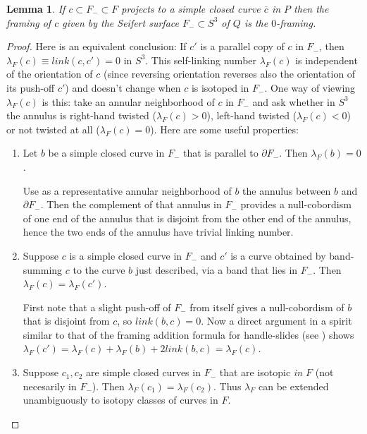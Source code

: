 \documentclass{amsart}
\newtheorem{lemma}[thm]{Lemma}
\newcommand{\bdd}{\mbox{$\partial$}}
\begin{document}
\begin{lemma} \label{lemma:framing} If $c \subset F_- \subset F$ projects to a simple closed curve $\overline{c}$ in $P$ then the framing of $c$ given by the Seifert surface $F_- \subset S^3$ of $Q$ is the $0$-framing. \end{lemma}

\begin{proof}  Here is an equivalent conclusion:  If $c'$ is a parallel copy of $c$ in $F_-$, then $\lambda_F(c) \equiv link(c, c') = 0$ in $S^3$.  This self-linking number $\lambda_F(c)$ is independent of the orientation of $c$ (since reversing orientation reverses also the orientation of its push-off $c'$) and doesn't change when $c$ is isotoped in $F_-$.  One way of viewing $\lambda_F(c)$ is this: take an annular neighborhood of $c$ in $F_-$ and ask whether in $S^3$ the annulus is right-hand twisted ($\lambda_F(c) > 0$), left-hand twisted ($\lambda_F(c) < 0$) or not twisted at all ($\lambda_F(c) = 0$).  Here are some useful properties:

\begin{enumerate}[ (a) ]
\item Let $b$ be a simple closed curve in $F_-$ that is parallel to $\bdd F_-$.  Then $\lambda_F(b) = 0$.

Use as a representative annular neighborhood of $b$ the annulus between $b$ and $\bdd F_-$.  Then the complement of that annulus in $F_-$ provides a null-cobordism of one end of the annulus that is disjoint from the other end of the annulus, hence the two ends of the annulus have trivial linking number.

\item  Suppose $c$ is a simple closed curve in $F_-$ and $c'$ is a curve obtained by band-summing $c$ to the curve $b$ just described, via a band that lies in $F_-$.  Then  $\lambda_F(c) = \lambda_F(c').$

First note that a slight push-off of $F_-$ from itself gives a null-cobordism of $b$ that is disjoint from $c$, so $link(b, c) = 0$.  Now a direct argument in a spirit similar to that of the framing addition formula for handle-slides (see \cite[5.1.1]{GS}) shows $\lambda_F(c') = \lambda_F(c) + \lambda_F(b) + 2link(b, c) = \lambda_F(c).$

\item \label{enum:isotopy} Suppose $c_1, c_2$ are simple closed curves in $F_-$ that are isotopic {\em in $F$} (not necesarily in $F_-$).  Then $\lambda_F(c_1) = \lambda_F(c_2).$  Thus $\lambda_F$ can be extended unambiguously to isotopy classes of curves in $F$.


\end{enumerate}
\end{proof}
\end{document}
